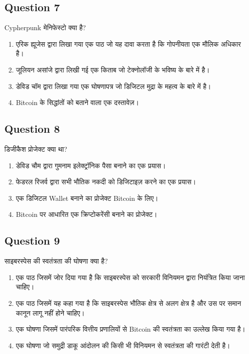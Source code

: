 \documentclass[12pt,a4paper]{article}
\begin{document}
\bigskip


\subsection*{Question 7}
Cypherpunk मेनिफेस्टो क्या है?

\begin{enumerate}[label=\Alph*., leftmargin=*]
\item एरिक ह्यूजेस द्वारा लिखा गया एक पाठ जो यह दावा करता है कि गोपनीयता एक मौलिक अधिकार है।
\item जूलियन असांजे द्वारा लिखी गई एक किताब जो टेक्नोलॉजी के भविष्य के बारे में है।
\item डेविड चॉम द्वारा लिखा गया एक घोषणापत्र जो डिजिटल मुद्रा के महत्व के बारे में है।
\item Bitcoin के सिद्धांतों को बताने वाला एक दस्तावेज़।
\end{enumerate}

\bigskip


\subsection*{Question 8}
डिजीकैश प्रोजेक्ट क्या था?

\begin{enumerate}[label=\Alph*., leftmargin=*]
\item डेविड चौम द्वारा गुमनाम इलेक्ट्रॉनिक पैसा बनाने का एक प्रयास।
\item फेडरल रिजर्व द्वारा सभी भौतिक नकदी को डिजिटाइज़ करने का एक प्रयास।
\item एक डिजिटल Wallet बनाने का प्रोजेक्ट Bitcoin के लिए।
\item Bitcoin पर आधारित एक क्रिप्टोकरेंसी बनाने का प्रोजेक्ट।
\end{enumerate}

\bigskip


\subsection*{Question 9}
साइबरस्पेस की स्वतंत्रता की घोषणा क्या है?

\begin{enumerate}[label=\Alph*., leftmargin=*]
\item एक पाठ जिसमें जोर दिया गया है कि साइबरस्पेस को सरकारी विनियमन द्वारा नियंत्रित किया जाना चाहिए।
\item एक पाठ जिसमें यह कहा गया है कि साइबरस्पेस भौतिक क्षेत्र से अलग क्षेत्र है और उस पर समान कानून लागू नहीं होने चाहिए।
\item एक घोषणा जिसमें पारंपरिक वित्तीय प्रणालियों से Bitcoin की स्वतंत्रता का उल्लेख किया गया है।
\item एक घोषणा जो समुद्री डाकू आंदोलन की किसी भी विनियमन से स्वतंत्रता की गारंटी देती है।
\end{enumerate}
\end{document}
